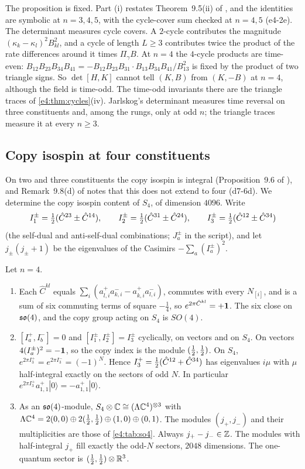 The proposition is fixed. Part (i) restates Theorem~9.5(ii) of \cite{RE}, and the identities are symbolic at $n=3,4,5$, with the cycle-cover
sum checked at $n=4,5$ (e4-2e). The determinant measures cycle covers. A $2$-cycle contributes the magnitude $(\kappa_k-\kappa_l)^2B_{kl}^2$, and a
cycle of length $L\ge3$ contributes twice the product of the rate differences around it times $\Pi_\gamma B$. At $n=4$ the $4$-cycle products are
time-even: $B_{12}B_{23}B_{34}B_{41}=-B_{12}B_{23}B_{31}\cdot B_{13}B_{34}B_{41}/B_{13}^2$ is fixed by the product of two triangle signs. So
$\det[H,K]$ cannot tell $(K,B)$ from $(K,-B)$ at $n=4$, although the field is time-odd. The time-odd invariants there are the triangle traces of
\cref{e4:thm:cycles}(iv). Jarlskog's determinant \cite{Jarlskog85} measures time reversal on three constituents and, among the rungs, only at odd
$n$; the triangle traces measure it at every $n\ge3$.

\subsection{Copy isospin at four constituents}
\label{e4:sec:isospin}

On two and three constituents the copy isospin is integral (Proposition~9.6 of \cite{RE}), and Remark~9.8(d) of \cite{RE} notes that this does
not extend to four (d7-6d). We determine the copy isospin content of $S_4$, of dimension $4096$. Write
\[
I^\pm_1=\tfrac12(\hat C^{23}\pm\hat C^{14}),\qquad I^\pm_2=\tfrac12(\hat C^{31}\pm\hat C^{24}),\qquad I^\pm_3=\tfrac12(\hat C^{12}\pm\hat C^{34})
\]
(the self-dual and anti-self-dual combinations; $J^\pm_a$ in the script), and let $j_\pm(j_\pm+1)$ be the eigenvalues of the Casimirs
$-\sum_a(I^\pm_a)^2$.

\begin{theorem}
\label{e4:thm:so4}
Let $n=4$.
\begin{enumerate}[label=(\roman*),leftmargin=2.2em]
\item Each $\hat C^{kl}$ equals $\sum_i(a^+_{l,i}a^-_{k,i}-a^+_{k,i}a^-_{l,i})$, commutes with every $N_{[i]}$, and is a sum of six commuting terms of square
$-\tfrac14$, so $e^{2\pi\hat C^{kl}}=+\mathbf 1$. The six close on $\mathfrak{so}(4)$, and the copy group acting on $S_4$ is $SO(4)$.
\item $[I^+_a,I^-_b]=0$ and $[I^\pm_1,I^\pm_2]=I^\pm_3$ cyclically, on vectors and on $S_4$. On vectors $4(I^\pm_a)^2=-\mathbf 1$, so the copy index is the module
$(\tfrac12,\tfrac12)$. On $S_4$, $e^{2\pi I^+_3}=e^{2\pi I^-_3}=(-1)^N$. Hence $I^+_3=\tfrac12(\hat C^{12}+\hat C^{34})$ has eigenvalues $i\mu$ with $\mu$ half-integral
exactly on the sectors of odd $N$. In particular $e^{2\pi I^+_3}a^+_{1,1}|0\rangle=-a^+_{1,1}|0\rangle$.
\item As an $\mathfrak{so}(4)$-module, $S_4\otimes\mathbb{C}\cong(\Lambda\mathbb{C}^4)^{\otimes3}$ with $\Lambda\mathbb{C}^4=2(0,0)\oplus2(\tfrac12,\tfrac12)\oplus(1,0)\oplus(0,1)$. The modules $(j_+,j_-)$ and their
multiplicities are those of \cref{e4:tab:so4}. Always $j_+-j_-\in\mathbb{Z}$. The modules with half-integral $j_+$ fill exactly the odd-$N$ sectors, $2048$
dimensions. The one-quantum sector is $(\tfrac12,\tfrac12)\otimes\mathbb{R}^3$.
\end{enumerate}
\end{theorem}

